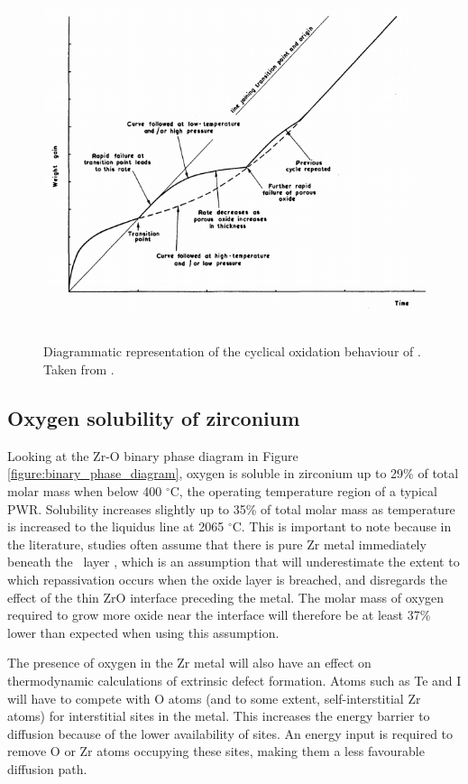 \begin{figure}[htp]
\centering
\includegraphics[height=10.5cm]{images/zro2_oxide_weight_gain.png}
\caption[Diagrammatic representation of the cyclical oxidation behaviour of \zirconia .]{Diagrammatic representation of the cyclical oxidation behaviour of \zirconia . Taken from \cite{cox1963some}.}
\label{figure:oxide_weight_gain}
\end{figure}

\subsection{Oxygen solubility of zirconium}

Looking at the Zr-O binary phase diagram in Figure \ref{figure:binary_phase_diagram}, oxygen is soluble in zirconium up to 29\% of total molar mass when below 400 $^{\circ}$C, the operating temperature region of a typical PWR. Solubility increases slightly up to 35\% of total molar mass as temperature is increased to the liquidus line at 2065 $^{\circ}$C. This is important to note because in the literature, studies often assume that there is pure Zr metal immediately beneath the \zirconia\ layer \cite{rossi2015first}, which is an assumption that will underestimate the extent to which repassivation occurs when the oxide layer is breached, and disregards the effect of the thin ZrO interface preceding the metal. The molar mass of oxygen required to grow more oxide near the interface will therefore be at least 37\% lower than expected when using this assumption.

The presence of oxygen in the Zr metal will also have an effect on thermodynamic calculations of extrinsic defect formation. Atoms such as Te and I will have to compete with O atoms (and to some extent, self-interstitial Zr atoms) for interstitial sites in the metal. This increases the energy barrier to diffusion because of the lower availability of sites. An energy input is required to remove O or Zr atoms occupying these sites, making them a less favourable diffusion path.


